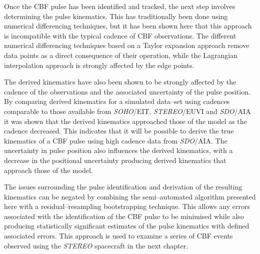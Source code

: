 Once the CBF pulse has been identified and tracked, the next step involves determining the pulse kinematics. This has traditionally been done using numerical differencing techniques, but it has been shown here that this approach is incompatible with the typical cadence of CBF observations. The different numerical differencing techniques based on a Taylor expansion approach remove data points as a direct consequence of their operation, while the Lagrangian interpolation approach is strongly affected by the edge points. 

The derived kinematics have also been shown to be strongly affected by the cadence of the observations and the associated uncertainty of the pulse position. By comparing derived kinematics for a simulated data--set using cadences comparable to those available from \emph{SOHO}/EIT, \emph{STEREO}/EUVI and \emph{SDO}/AIA it was shown that the derived kinematics approached those of the model as the cadence decreased. This indicates that it will be possible to derive the true kinematics of a CBF pulse using high cadence data from \emph{SDO}/AIA. The uncertainty in pulse position also influences the derived kinematics, with a decrease in the positional uncertainty producing derived kinematics that approach those of the model.

The issues surrounding the pulse identification and derivation of the resulting kinematics can be negated by combining the semi--automated algorithm presented here with a residual--resampling bootstrapping technique. This allows any errors associated with the identification of the CBF pulse to be minimised while also producing statistically significant estimates of the pulse kinematics with defined associated errors.  This approach is used to examine a series of CBF events observed using the \emph{STEREO} spacecraft in the next chapter.